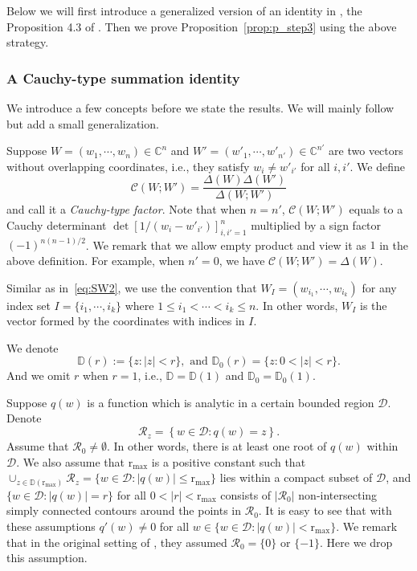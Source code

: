 \documentclass{article}
\numberwithin{equation}{section}
\newcommand{\Ch}{\mathcal{C}}
\newcommand{\complexC}{\mathbb{C}}
\newcommand{\rr}{\mathrm{r_{max}}}
\begin{document}
Below we will first introduce a generalized version of an identity in \cite{Liu19}, the Proposition 4.3 of \cite{Liu19}. Then we prove Proposition~\ref{prop:p_step3} using the above strategy.

\subsubsection{A Cauchy-type summation identity}

We introduce a few concepts before we state the results. We will mainly follow \cite[Section 4]{Liu19} but add a small generalization.

Suppose $W=(w_1,\cdots,w_n)\in\complexC^n$ and $W'=(w'_1,\cdots,w'_{n'})\in\complexC^{n'}$ are two vectors without overlapping coordinates, i.e., they satisfy $w_i\ne w'_{i'}$ for all $i,i'$. We define
\begin{equation}
	\label{eq:2021_12_23_02}
	\Ch(W;W') = \frac{\Delta(W)\Delta(W')}{\Delta(W;W')}
\end{equation}
and call it a \emph{Cauchy-type factor}. Note that when $n=n'$, $\Ch(W;W')$ equals to a Cauchy determinant $\det\left[1/(w_i-w'_{i'})\right]_{i,i'=1}^n$ multiplied by a sign factor $(-1)^{n(n-1)/2}$. We remark that we allow empty product and view it as $1$ in the above definition. For example, when $n'=0$, we have $\Ch(W;W')=\Delta(W)$.

Similar as in~\eqref{eq:SW2}, we use the convention that $W_I=(w_{i_1},\cdots,w_{i_k})$ for 
any index set $I=\{i_1,\cdots,i_k\}$ where $1\le i_1<\cdots<i_k\le n$. In other words, $W_I$ is the vector formed by the coordinates with indices in $I$.

We denote 
\begin{equation*}
	\mathbb{D}(r) := \{z: |z|< r\}, \text{ and } \mathbb{D}_0(r) = \{z: 0<|z|<r\}.
\end{equation*}
And we omit $r$ when $r=1$, i.e., $\mathbb{D}=\mathbb{D}(1)$ and $\mathbb{D}_0=\mathbb{D}_0(1)$. 

Suppose $q(w)$ is a function which is analytic in a certain bounded region $\mathcal{D}$. Denote
\begin{equation}
	\mathcal{R}_z=\left\{
	              w\in \mathcal{D}: q(w)=z\right\}.
\end{equation}
Assume that $\mathcal{R}_0\ne \emptyset$. In other words, there is at least one root of $q(w)$ within $\mathcal{D}$. We also assume that $\rr$ is a positive constant such that $\cup_{z\in\mathbb{D}(\rr)}\mathcal{R}_z=\{w\in\mathcal{D}:|q(w)|\le\rr\}$ lies within a compact subset of $\mathcal{D}$, and $\{w\in\mathcal{D}:|q(w)|=r\}$ for all $0<|r|<\rr$ consists of $|\mathcal{R}_0|$ non-intersecting simply connected contours around the points in $\mathcal{R}_0$. It is easy to see that with these assumptions $q'(w)\ne 0$ for all $w\in \{w\in\mathcal{D}:|q(w)|<\rr\}$. We remark that in the original setting of \cite{Liu19}, they assumed $\mathcal{R}_0=\{0\}$ or $\{-1\}$. Here we drop this assumption.
\end{document}
